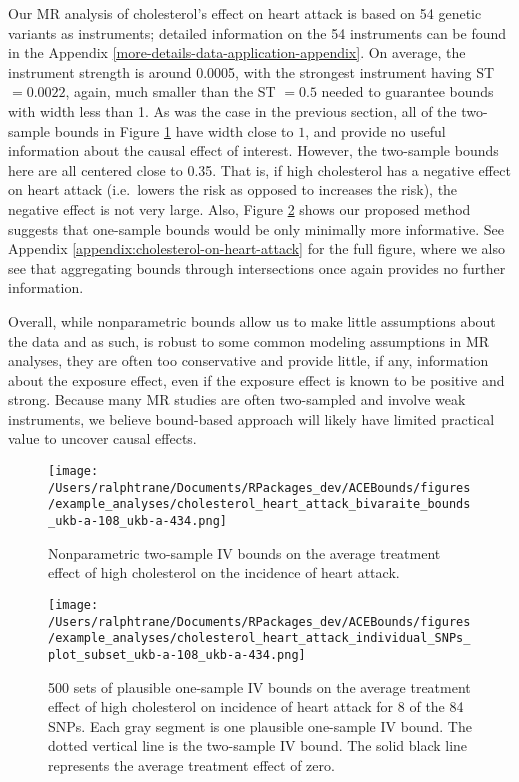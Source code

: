 \documentclass[
]{article}
\theoremstyle{plain}
\begin{document}
Our MR analysis of cholesterol's effect on heart attack is based on 54 genetic variants as instruments; detailed information on the 54 instruments can be found in the Appendix \ref{more-details-data-application-appendix}. On average, the instrument strength is around 0.0005, with the strongest instrument having ST \(= 0.0022\), again, much smaller than the ST \(= 0.5\) needed to guarantee bounds with width less than 1. As was the case in the previous section, all of the two-sample bounds in Figure \ref{fig:cholesterol_on_heart_attack_ind_bounds} have width close to \(1\), and provide no useful information about the causal effect of interest. However, the two-sample bounds here are all centered close to 0.35. That is, if high cholesterol has a negative effect on heart attack (i.e.~lowers the risk as opposed to increases the risk), the negative effect is not very large. Also, Figure \ref{fig:cholesterol_on_heart_attack_tri_bounds} shows our proposed method suggests that one-sample bounds would be only minimally more informative. See Appendix \ref{appendix:cholesterol-on-heart-attack} for the full figure, where we also see that aggregating bounds through intersections once again provides no further information.

Overall, while nonparametric bounds allow us to make little assumptions about the data and as such, is robust to some common modeling assumptions in MR analyses, they are often too conservative and provide little, if any, information about the exposure effect, even if the exposure effect is known to be positive and strong. Because many MR studies are often two-sampled and involve weak instruments, we believe bound-based approach will likely have limited practical value to uncover causal effects.

\begin{figure}[H]
  \texttt{[image: /Users/ralphtrane/Documents/RPackages\_dev/ACEBounds/figures/example\_analyses/cholesterol\_heart\_attack\_bivaraite\_bounds\_ukb-a-108\_ukb-a-434.png]}
  \caption{Nonparametric two-sample IV bounds on the average treatment effect of high cholesterol on the incidence of heart attack.}
  \label{fig:cholesterol_on_heart_attack_ind_bounds}
\end{figure}

\begin{figure}[H]
  \texttt{[image: /Users/ralphtrane/Documents/RPackages\_dev/ACEBounds/figures/example\_analyses/cholesterol\_heart\_attack\_individual\_SNPs\_plot\_subset\_ukb-a-108\_ukb-a-434.png]}
    \caption{500 sets of plausible one-sample IV bounds on the average treatment effect of high cholesterol on incidence of heart attack for 8 of the 84 SNPs. Each gray segment is one plausible one-sample IV bound. The dotted vertical line is the two-sample IV bound. The solid black line represents the average treatment effect of zero.}
    \label{fig:cholesterol_on_heart_attack_tri_bounds}
\end{figure}
\end{document}
